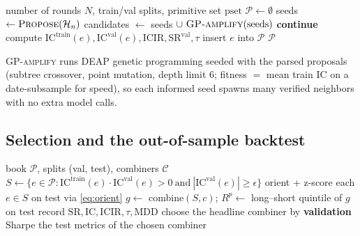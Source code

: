\documentclass[11pt]{article}
\theoremstyle{definition}
\theoremstyle{plain}
\theoremstyle{remark}
\newcommand{\Sharpe}{\mathrm{SR}}
\newcommand{\IC}{\mathrm{IC}}
\newcommand{\ICIR}{\mathrm{ICIR}}
\begin{document}
\begin{algorithm}[h]
\caption{Outer search: propose $\to$ amplify $\to$ verify $\to$ evaluate $\to$ store}
\begin{algorithmic}[1]
\Require number of rounds $N$, train/val splits, primitive set $\mathrm{pset}$
\State $\mathcal{P}\gets\emptyset$ 
  \State seeds $\gets \textsc{Propose}(\mathcal{H}_n)$ 
  \State candidates $\gets$ seeds $\cup\ \textsc{GP-amplify}(\text{seeds})$ 
     \textbf{continue} 
    \EndIf
    \State compute $\IC^{\text{train}}(e), \IC^{\text{val}}(e), \ICIR, \Sharpe^{\text{val}}, \tau$ 
    \State insert $e$ into $\mathcal{P}$
  \EndFor
\EndFor
\State \Return $\mathcal{P}$
\end{algorithmic}
\end{algorithm}

\textsc{GP-amplify} runs DEAP genetic programming seeded with the parsed proposals (subtree
crossover, point mutation, depth limit 6; fitness $=$ mean train $\IC$ on a date-subsample for
speed), so each informed seed spawns many verified neighbors with no extra model calls.

\subsection{Selection and the out-of-sample backtest}

\begin{algorithm}[h]
\caption{From the book to one out-of-sample number}
\begin{algorithmic}[1]
\Require book $\mathcal{P}$, splits (val, test), combiners $\mathcal{C}$
\State $S \gets \{e\in\mathcal{P} : \IC^{\text{train}}(e)\cdot \IC^{\text{val}}(e) > 0 \ \text{and}\ |\IC^{\text{val}}(e)| \ge \epsilon\}$ 
\State orient + z-score each $e\in S$ on test via \eqref{eq:orient} 
  \State $g \gets$ combine$(S, c)$; \quad $R^p \gets$ long--short quintile of $g$ on test \Comment{\eqref{eq:lsret}}
  \State record $\Sharpe, \IC, \ICIR, \tau, \mathrm{MDD}$ \Comment{\eqref{eq:sharpe}}
\EndFor
\State choose the headline combiner by \textbf{validation} Sharpe 
\State \Return the test metrics of the chosen combiner
\end{algorithmic}
\end{algorithm}
\end{document}
